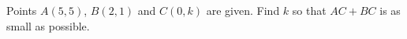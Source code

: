 Points $A(5,5)$, $B(2,1)$ and $C(0,k)$ are given. Find $k$ so that $AC+BC$ is as small as possible.
